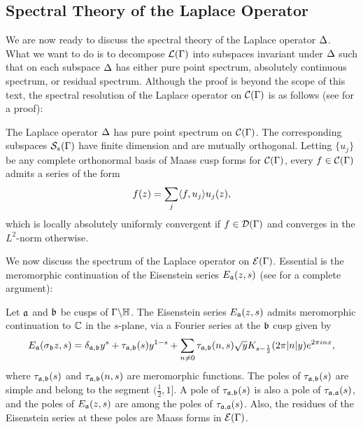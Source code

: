     \subsection*{Spectral Theory of the Laplace Operator}
      We are now ready to discuss the spectral theory of the Laplace operator $\Delta$. What we want to do is to decompose $\mathcal{L}(\Gamma)$ into subspaces invariant under $\Delta$ such that on each subspace $\Delta$ has either pure point spectrum, absolutely continuous spectrum, or residual spectrum. Although the proof is beyond the scope of this text, the spectral resolution of the Laplace operator on $\mathcal{C}(\Gamma)$ is as follows (see \cite{iwaniec2002spectral} for a proof):

      \begin{theorem}\label{thm:cusp_form_spectrum}
        The Laplace operator $\Delta$ has pure point spectrum on $\mathcal{C}(\Gamma)$. The corresponding subspaces $\mathcal{S}_{s}(\Gamma)$ have finite dimension and are mutually orthogonal. Letting $\{u_{j}\}$ be any complete orthonormal basis of Maass cusp forms for $\mathcal{C}(\Gamma)$, every $f \in \mathcal{C}(\Gamma)$ admits a series of the form
        \[
          f(z) = \sum_{j}\langle f,u_{j}\rangle u_{j}(z),
        \]
        which is locally absolutely uniformly convergent if $f \in \mathcal{D}(\Gamma)$ and converges in the $L^{2}$-norm otherwise.
      \end{theorem}

      We now discuss the spectrum of the Laplace operator on $\mathcal{E}(\Gamma)$. Essential is the meromorphic continuation of the Eisenstein series $E_{\mathfrak{a}}(z,s)$ (see \cite{iwaniec2002spectral} for a complete argument):

      \begin{theorem}\label{thm:meromorphic_continuation_of_Eisenstein_series}
        Let $\mathfrak{a}$ and $\mathfrak{b}$ be cusps of $\Gamma\backslash\mathbb{H}$. The Eisenstein series $E_{\mathfrak{a}}(z,s)$ admits meromorphic continuation to $\mathbb{C}$ in the $s$-plane, via a Fourier series at the $\mathfrak{b}$ cusp given by
        \[
          E_{\mathfrak{a}}(\sigma_{\mathfrak{b}}z,s) = \delta_{\mathfrak{a},\mathfrak{b}}y^{s}+\tau_{\mathfrak{a},\mathfrak{b}}(s)y^{1-s}+\sum_{n \neq 0}\tau_{\mathfrak{a},\mathfrak{b}}(n,s)\sqrt{y}K_{s-\frac{1}{2}}(2\pi|n|y)e^{2\pi inx},
        \]
        where $\tau_{\mathfrak{a},\mathfrak{b}}(s)$ and $\tau_{\mathfrak{a},\mathfrak{b}}(n,s)$ are meromorphic functions. The poles of $\tau_{\mathfrak{a},\mathfrak{b}}(s)$ are simple and belong to the segment $(\frac{1}{2},1]$. A pole of $\tau_{\mathfrak{a},\mathfrak{b}}(s)$ is also a pole of $\tau_{\mathfrak{a},\mathfrak{a}}(s)$, and the poles of $E_{\mathfrak{a}}(z,s)$ are among the poles of $\tau_{\mathfrak{a},\mathfrak{a}}(s)$. Also, the residues of the Eisenstein series at these poles are Maass forms in $\mathcal{E}(\Gamma)$.
      \end{theorem}

